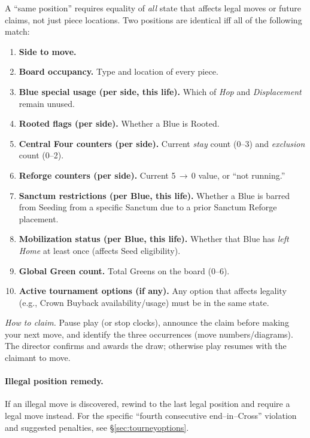 \documentclass[11pt]{article}
\begin{document}
\begin{tcolorbox}[enhanced,breakable,title={Threefold Repetition — Position Equivalence},colback=white,colframe=royal,boxrule=0.8pt]
\small
A “same position” requires equality of \emph{all} state that affects legal moves or future claims, not just piece locations. Two positions are identical iff all of the following match:
\begin{enumerate}[leftmargin=1.5em,itemsep=0.2em]
  \item \textbf{Side to move.}
  \item \textbf{Board occupancy.} Type and location of every piece.
  \item \textbf{Blue special usage (per side, this life).} Which of \emph{Hop} and \emph{Displacement} remain unused.
  \item \textbf{Rooted flags (per side).} Whether a Blue is Rooted.
  \item \textbf{Central Four counters (per side).} Current \emph{stay} count (0–3) and \emph{exclusion} count (0–2).
  \item \textbf{Reforge counters (per side).} Current 5\,$\to$\,0 value, or “not running.”
  \item \textbf{Sanctum restrictions (per Blue, this life).} Whether a Blue is barred from Seeding from a specific Sanctum due to a prior Sanctum Reforge placement.
  \item \textbf{Mobilization status (per Blue, this life).} Whether that Blue has \emph{left Home} at least once (affects Seed eligibility).
  \item \textbf{Global Green count.} Total Greens on the board (0–6).
  \item \textbf{Active tournament options (if any).} Any option that affects legality (e.g., Crown Buyback availability/usage) must be in the same state.
\end{enumerate}
\textit{How to claim.} Pause play (or stop clocks), announce the claim before making your next move, and identify the three occurrences (move numbers/diagrams). The director confirms and awards the draw; otherwise play resumes with the claimant to move.
\end{tcolorbox}

\paragraph{Illegal position remedy.}
If an illegal move is discovered, rewind to the last legal position and require a legal move instead. For the specific “fourth consecutive end–in–Cross” violation and suggested penalties, see §\ref{sec:tourneyoptions}.
\end{document}
